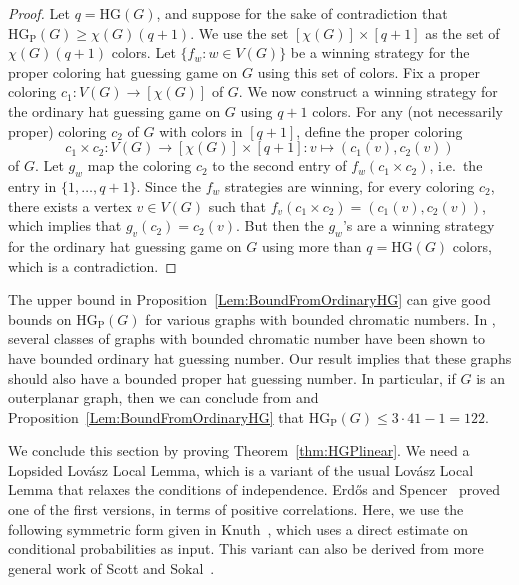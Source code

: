 \documentclass[a4paper,11pt]{amsproc}
\theoremstyle{plain}
\theoremstyle{definition}
\newcommand{\HG}{{\mathrm{HG}}}
\newcommand{\HGP}{\mathrm{HG_{P}}}
\begin{document}
\begin{proof}
 Let $q = \HG(G)$, and suppose for the sake of contradiction that $\HGP(G) \geq \chi(G)(q+1)$.
 We use the set $[\chi(G)] \times [q+1]$ as the set of $\chi(G)(q+1)$ colors.
 Let $\{ f_w : w \in V(G)\}$ be a winning strategy for the proper coloring hat guessing game on $G$ using this set of colors.
 Fix a proper coloring $c_1: V(G) \to [\chi(G)]$ of $G$.
 We now construct a winning strategy for the ordinary hat guessing game on $G$ using $q+1$ colors.
 For any (not necessarily proper) coloring $c_2$ of $G$ with colors in $[q+1]$, define the proper coloring
 \[
  c_1 \times c_2: V(G) \to [\chi(G)] \times [q+1]:
  v \mapsto (c_1(v), c_2(v))
 \]
 of $G$.
 Let $g_w$ map the coloring $c_2$ to the second entry of $f_w(c_1 \times c_2)$, i.e.\ the entry in $\{1,\dots,q+1\}$.
 Since the $f_w$ strategies are winning, for every coloring $c_2$, there exists a vertex $v \in V(G)$ such that $f_v(c_1 \times c_2) = (c_1(v),c_2(v))$, which implies that $g_v(c_2) = c_2(v)$.
 But then the $g_w$'s are a winning strategy for the ordinary hat guessing game on $G$ using more than $q = \HG(G)$ colors, which is a contradiction.
\end{proof}

The upper bound in Proposition~\ref{Lem:BoundFromOrdinaryHG} can give good bounds on $\HGP(G)$ for various graphs with bounded chromatic numbers. 
In \cite{Knierim2023}, several classes of graphs with bounded chromatic number have been shown to have bounded ordinary hat guessing number.
Our result implies that these graphs should also have a bounded proper hat guessing number. 
In particular, if $G$ is an outerplanar graph, then we can conclude from \cite[Theorem 1.4]{Knierim2023} and Proposition~\ref{Lem:BoundFromOrdinaryHG} that $\HGP(G) \leq 3\cdot41 - 1= 122.$

\bigskip 

We conclude this section by proving Theorem~\ref{thm:HGPlinear}.
We need a Lopsided Lov\'asz Local
Lemma, which is a variant of the usual Lov\'asz Local Lemma that relaxes the conditions of independence. Erd\H{o}s and Spencer~\cite{ErdosSpencer} proved one of the first versions, in terms of positive correlations.
Here, we use the following symmetric form given in
Knuth~\cite[p.~82, Section 7.2.2.2, Lemma~L and Theorem~J]{KnuthBook}, which uses a direct estimate on conditional probabilities as input. This variant can also be derived from more general work of Scott and Sokal~\cite[Theorem~4.1, Definition~2.14, and Corollary~5.7]{ScottSokal}.
\end{document}
